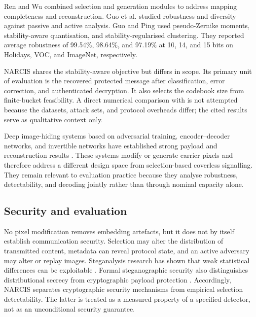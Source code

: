 ﻿\documentclass[a4paper,fleqn]{cas-dc}
\newcommand{\method}{NARCIS\xspace}
\begin{document}
Ren and Wu \cite{ren2024joint} combined selection and generation modules to
address mapping completeness and reconstruction. Guo et al.
\cite{guo2025diverse} studied robustness and diversity against passive and
active analysis. Guo and Ping \cite{guo2026capacity} used pseudo-Zernike
moments, stability-aware quantisation, and stability-regularised clustering.
They reported average robustness of 99.54\%, 98.64\%, and 97.19\% at 10, 14,
and 15 bits on Holidays, VOC, and ImageNet, respectively.

\method shares the stability-aware objective but differs in scope. Its
primary unit of evaluation is the recovered protected message after
classification, error correction, and authenticated decryption. It also
selects the codebook size from finite-bucket feasibility. A direct numerical
comparison with \cite{guo2026capacity} is not attempted
because the datasets, attack sets, and protocol overheads differ; the cited
results serve as qualitative context only.

Deep image-hiding systems based on adversarial training, encoder--decoder
networks, and invertible networks have established strong payload and
reconstruction results \cite{baluja2017hiding,hayes2017generating,
zhu2018hidden,zhang2019steganogan,jing2021hinet,lu2021isn}. These systems
modify or generate carrier pixels and therefore address a different design
space from selection-based coverless signalling. They remain relevant to
evaluation practice because they analyse robustness, detectability, and
decoding jointly rather than through nominal capacity alone.

\subsection{Security and evaluation}

No pixel modification removes embedding artefacts, but it does not by itself
establish communication security. Selection may alter the distribution of
transmitted content, metadata can reveal protocol state, and an active
adversary may alter or replay images. Steganalysis research has shown that
weak statistical differences can be exploitable
\cite{fridrich2012rich,holub2014uniward,xu2016steganalysis,
ye2017steganalysis,yedroudj2018net,boroumand2018srnet}. Formal
steganographic security also distinguishes distributional secrecy from
cryptographic payload protection \cite{cachin1998steganography}.
Accordingly, \method separates
cryptographic security mechanisms from empirical selection detectability.
The latter is treated as a measured property of a specified detector, not as
an unconditional security guarantee.
\end{document}
